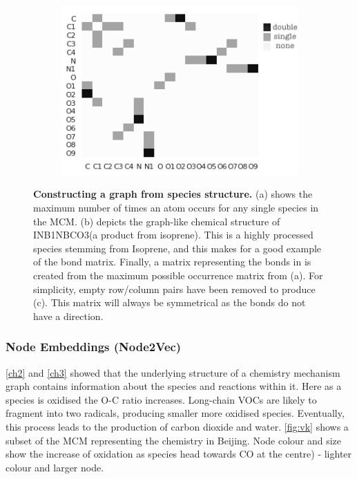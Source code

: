 \begin{figure}[H]
\begin{subfigure}[b]{0.325\textwidth}
         \includegraphics[width=\textwidth,height=.8\textwidth]{4fig/INB1NBCO3_adj.png}
          \caption{}
         \label{fig:adjmol}
     \end{subfigure}

        \caption{ \textbf{Constructing a graph from species structure.}
        (a) shows the maximum number of times an atom occurs for any single species in the MCM. (b) depicts the graph-like chemical structure of {INB1NBCO3}(a product from isoprene). This is a highly processed species stemming from Isoprene, and this makes for a good example of the bond matrix. Finally, a matrix representing the bonds in  is created from the maximum possible occurrence matrix from (a). For simplicity, empty row/column pairs have been removed to produce (c). This matrix will always be symmetrical as the bonds do not have a direction.}
        \label{fig:bondmat}
\end{figure}


\subsubsection{Node Embeddings (Node2Vec)}\label{sec:n2vec}
\autoref{ch2} and \autoref{ch3} showed that the underlying structure of a chemistry mechanism graph contains information about the species and reactions within it.  Here as a species is oxidised the O-C ratio increases. Long-chain VOCs are likely to fragment into two radicals, producing smaller more oxidised species. Eventually, this process leads to the production of carbon dioxide and water. \autoref{fig:vk} shows a subset of the MCM representing the chemistry in Beijing. Node colour and size show the increase of oxidation as species head towards CO at the centre) - lighter colour and larger node.

